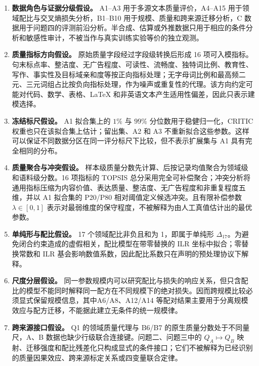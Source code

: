 \begin{enumerate}
  \item \textbf{数据角色与证据分级假设。} A1--A3 用于多源文本质量评价，A4--A15 用于领域配比与交叉熵损失分析，B1--B10 用于规模、质量和跨来源迁移分析，C 数据用于问题四的评测前沿分析。半合成、估算或外推数据只用于相应的条件分析和敏感性审计，不被当作与真实训练实验等价的独立观测。

  \item \textbf{质量指标方向假设。} 原始质量字段经过字段级转换后形成 16 项可入模指标。句末标点率、整洁度、无广告程度、可读性、流畅度、独特词比例、教育性、写作、事实性及目标域亲和度等按正向指标处理；无字母词比例和最高频二元、三元词组占比按负向指标处理，作为噪声或重复性的代理。该方向约定可能对代码、数学、表格、LaTeX 和非英语文本产生适用性偏差，因此只表示建模选择。

  \item \textbf{冻结标尺假设。} A1 拟合集上的 $1\%$ 与 $99\%$ 分位数用于稳健归一化，CRITIC 权重也只在该拟合集上估计；留出集、A2 和 A3 不重新拟合这些参数。这样可以保证不同数据分区在同一评分标尺下比较，但不表示扩展集与 A1 具有完全相同的分布。

  \item \textbf{质量聚合与冲突假设。} 样本级质量分数先计算、后按记录均值聚合为领域级和语料级分数。16 项指标的 TOPSIS 总分采用完全可补偿聚合；冲突分析将通用指标压缩为内容价值、表达质量、整洁度、无广告程度和非重复程度五维，并以 A1 拟合集的 P20/P80 相对阈值定义候选冲突。且有限补偿参数 $\lambda\in[0,1]$ 表示对最弱维度的保守程度，不被解释为由人工真值估计出的最优参数。

  \item \textbf{单纯形与配比假设。} 17 个领域配比非负且和为 1，即属于单纯形 $\Delta_{17}$。为避免闭合约束造成的虚假相关，配比模型在带零替换的 ILR 坐标中拟合；零替换常数和 ILR 基会影响数值系数，因此配比系数只在声明的预处理协议下解释。

  \item \textbf{尺度分层假设。} 同一参数规模内可以研究配比与损失的响应关系，但只含配比的模型不能同时解释同一配方在不同规模下的绝对损失。因而跨规模比较必须显式保留规模信息，其中A6/A8、A12/A14 等配对结果主要用于分离规模效应与配方迁移，不能据此建立无条件的统一规模律。

  \item \textbf{跨来源接口假设。} Q1 的领域质量代理与 B6/B7 的原生质量分数处于不同量尺，A、B 数据也缺少行级联合连接键。问题二、问题三中的 $Q_A\mapsto Q_B$ 映射、迁移强度和配比残差化只构成显式的条件接口；它们不被解释为已经识别的质量因果效应、跨来源标定关系或四变量联合定律。


\end{enumerate}
